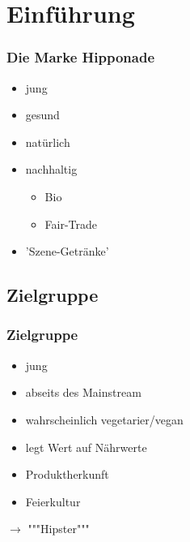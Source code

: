 \section{Einführung} 
\begin{frame}
	\frametitle{Die Marke Hipponade} 
	\begin{itemize}
		\item jung
		\item gesund
		\item natürlich
		\item nachhaltig
		\begin{itemize}
			\item Bio
			\item Fair-Trade
		\end{itemize}
		\item 'Szene-Getränke'
	\end{itemize}
\end{frame}

\subsection{Zielgruppe}
\begin{frame}
	\frametitle{Zielgruppe}
	\begin{itemize}
		\item jung
		\item abseits des Mainstream
		\item wahrscheinlich vegetarier/vegan
		\item legt Wert auf Nährwerte
		\item Produktherkunft
		\item Feierkultur
	\end{itemize}
	\begin{center}
		$\longrightarrow$ """Hipster"""
	\end{center}
\end{frame}